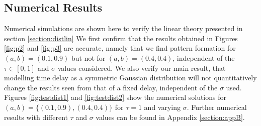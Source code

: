 \subsection{Numerical Results}\label{section:distsim}
Numerical simulations are shown here to verify the linear theory presented in section \ref{section:distlin}  We first confirm that the results obtained in Figures \ref{fig:p2} and \ref{fig:p3} are accurate, namely that we find pattern formation for $(a,b)=(0.1,0.9)$ but not for $(a,b)=(0.4,0.4)$, independent of the $\tau\in[0,1]$ and $\sigma$ values considered. We also verify our main result, that modelling time delay as a symmetric Gaussian distribution will not quantitatively change the results seen from that of a fixed delay, independent of the $\sigma$ used. Figures \ref{fig:testdist1} and \ref{fig:testdist2} show the numerical solutions for $(a,b)=\{(0.1,0.9),(0.4,0.4)\}$ for $\tau=1$ and varying $\sigma$. Further numerical results with different $\tau$ and $\sigma$ values can be found in Appendix \ref{section:appB}.

